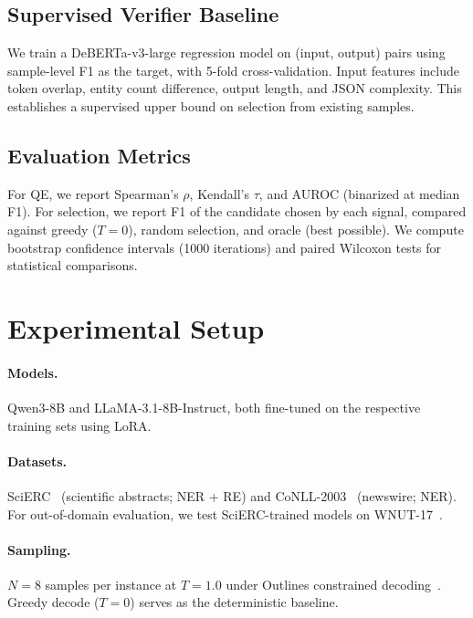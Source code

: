 \documentclass[11pt,a4paper]{article}
\begin{document}
\subsection{Supervised Verifier Baseline}

We train a DeBERTa-v3-large regression model on (input, output) pairs using sample-level F1 as the target, with 5-fold cross-validation. Input features include token overlap, entity count difference, output length, and JSON complexity. This establishes a supervised upper bound on selection from existing samples.

\subsection{Evaluation Metrics}

For QE, we report Spearman's $\rho$, Kendall's $\tau$, and AUROC (binarized at median F1). For selection, we report F1 of the candidate chosen by each signal, compared against greedy ($T{=}0$), random selection, and oracle (best possible). We compute bootstrap confidence intervals (1000 iterations) and paired Wilcoxon tests for statistical comparisons.

\section{Experimental Setup}

\paragraph{Models.} Qwen3-8B and LLaMA-3.1-8B-Instruct, both fine-tuned on the respective training sets using LoRA.

\paragraph{Datasets.} SciERC~\cite{luan2018scierc} (scientific abstracts; NER + RE) and CoNLL-2003~\cite{tjong2003conll} (newswire; NER). For out-of-domain evaluation, we test SciERC-trained models on WNUT-17~\cite{derczynski2017wnut}.

\paragraph{Sampling.} $N{=}8$ samples per instance at $T{=}1.0$ under Outlines constrained decoding~\cite{willard2023outlines}. Greedy decode ($T{=}0$) serves as the deterministic baseline.
\end{document}
